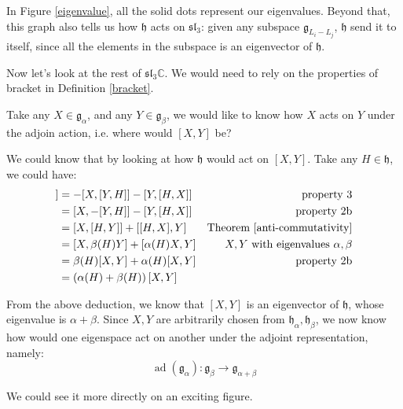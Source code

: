 \documentclass[a4paper]{article}
\newcommand{\slC}{\mathfrak{sl}_3\mathbb{C}}
\theoremstyle{bfnote} %
\theoremstyle{bfnote}                  %
\theoremstyle{example}                       %
\theoremstyle{remark}                       %
\numberwithin{equation}{section}
\begin{document}
 In Figure \ref{eigenvalue}, all the solid dots represent our eigenvalues. Beyond that, this graph also tells us how $\mathfrak{h}$ acts on $\mathfrak{sl}_3$: given any subspace  $\mathfrak{g}_{L_i-L_j}$, $\mathfrak{h}$ send it to itself, since all the elements in the subspace is an eigenvector of  $\mathfrak{h}$.
\bigskip

Now let's look at the rest of $\slC$. We would need to rely on the properties of bracket in Definition \ref{bracket}.

Take any $X \in \mathfrak{g}_\alpha$, and any $Y \in \mathfrak{g}_{\beta}$, we would like to know how $X$ acts on  $Y$ under the adjoin action, i.e. where would $\left[ X,Y \right] $ be? 

We could know that by looking at how  $\mathfrak{h}$ would act on  $\left[ X,Y \right] $. Take any $H \in \mathfrak{h}$, we could have:
\begin{align*}
	[H, [X,Y]] &=  -[X,[Y,H]] - [Y,[H,X]] & \text{property 3} \\
	  &= [X,-[Y,H]] - [Y, [H,X]] & \text{property 2b} \\
		  &= [X, [H,Y]] + [[H,X],Y] & \text{Theorem } \ref{anti-commutativity} \\
		  &= [X, \beta(H) Y] + [\alpha(H)X, Y] & \text{$X,Y$ with eigenvalues  $\alpha, \beta$} \\
		  &= \beta(H)[X,Y] + \alpha(H)[X,Y] & \text{property 2b} \\
		  &= \left( \alpha(H) + \beta(H) \right)[X,Y]  
\end{align*}

From the above deduction, we know that $[X,Y]$ is an eigenvector of  $\mathfrak{h}$, whose eigenvalue is  $\alpha + \beta$. Since  $X, Y$ are arbitrarily chosen from  $\mathfrak{h}_\alpha, \mathfrak{h}_\beta$, we now know how would one eigenspace act on another under the adjoint representation, namely:  \begin{equation}\label{other}
	\operatorname{ad}\left( \mathfrak{g}_{\alpha} \right): \mathfrak{g}_{\beta} \to \mathfrak{g}_{\alpha+\beta} 
\end{equation}

We could see it more directly on an exciting figure.
\end{document}
